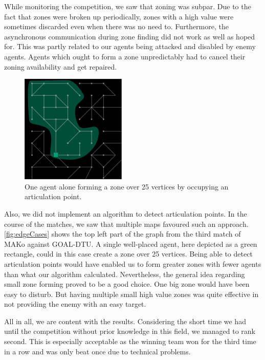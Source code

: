 While monitoring the competition, we saw that zoning was subpar.
Due to the fact that zones were broken up periodically, zones with a high value were sometimes discarded even when there was no need to.
Furthermore, the asynchronous communication during zone finding did not work as well as hoped for.
This was partly related to our agents being attacked and disabled by enemy agents.
Agents which ought to form a zone unpredictably had to cancel their zoning availability and get repaired.
\begin{figure}[h]
	\centering
	\includegraphics[width=.5\textwidth]{images/resultsEdgeCase.png}
  \caption{One agent alone forming a zone over 25 vertices by occupying an articulation point.}
	\label{fig:edgeCases}
\end{figure}
Also, we did not implement an algorithm to detect articulation points.
In the course of the matches, we saw that multiple maps favoured such an approach.
\autoref{fig:edgeCases} shows the top left part of the graph from the third match of MAKo against GOAL-DTU.
A single well-placed agent, here depicted as a green rectangle, could in this case create a zone over 25 vertices.
Being able to detect articulation points would have enabled us to form greater zones with fewer agents than what our algorithm calculated.
Nevertheless, the general idea regarding small zone forming proved to be a good choice.
One big zone would have been easy to disturb.
But having multiple small high value zones was quite effective in not providing the enemy with an easy target.

All in all, we are content with the results.
Considering the short time we had until the competition without prior knowledge in this field, we managed to rank second.
This is especially acceptable as the winning team won for the third time in a row and was only beat once due to technical problems.
